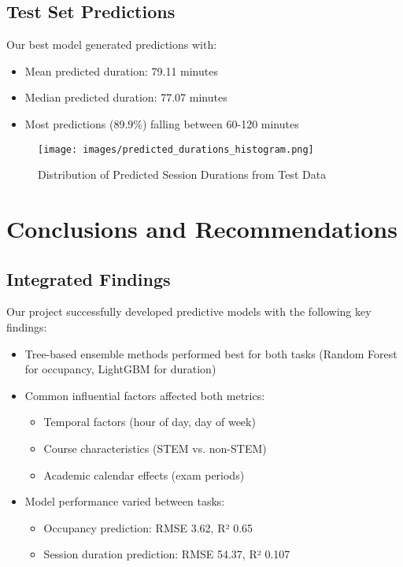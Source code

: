 \documentclass[12pt,letterpaper]{article}
\begin{document}
\subsection{Test Set Predictions}

Our best model generated predictions with:
\begin{itemize}
    \item Mean predicted duration: 79.11 minutes
    \item Median predicted duration: 77.07 minutes
    \item Most predictions (89.9\%) falling between 60-120 minutes
\end{itemize}

\begin{figure}[H]
    \centering
    \texttt{[image: images/predicted\_durations\_histogram.png]}
    \caption{Distribution of Predicted Session Durations from Test Data}
\end{figure}

\section{Conclusions and Recommendations}

\subsection{Integrated Findings}

Our project successfully developed predictive models with the following key findings:

\begin{itemize}
    \item Tree-based ensemble methods performed best for both tasks (Random Forest for occupancy, LightGBM for duration)
    
    \item Common influential factors affected both metrics:
    \begin{itemize}
        \item Temporal factors (hour of day, day of week)
        \item Course characteristics (STEM vs. non-STEM)
        \item Academic calendar effects (exam periods)
    \end{itemize}
    
    \item Model performance varied between tasks:
    \begin{itemize}
        \item Occupancy prediction: RMSE 3.62, R² 0.65
        \item Session duration prediction: RMSE 54.37, R² 0.107
    \end{itemize}
\end{itemize}
\end{document}
